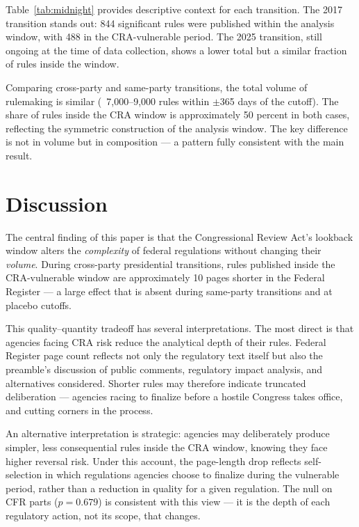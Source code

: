 \documentclass[12pt]{article}
\begin{document}


Table~\ref{tab:midnight} provides descriptive context for each transition. The 2017 transition stands out: 844 significant rules were published within the analysis window, with 488 in the CRA-vulnerable period. The 2025 transition, still ongoing at the time of data collection, shows a lower total but a similar fraction of rules inside the window.

Comparing cross-party and same-party transitions, the total volume of rulemaking is similar (~7,000--9,000 rules within $\pm$365 days of the cutoff). The share of rules inside the CRA window is approximately 50 percent in both cases, reflecting the symmetric construction of the analysis window. The key difference is not in volume but in composition --- a pattern fully consistent with the main result.


\section{Discussion}

The central finding of this paper is that the Congressional Review Act's lookback window alters the \textit{complexity} of federal regulations without changing their \textit{volume}. During cross-party presidential transitions, rules published inside the CRA-vulnerable window are approximately 10 pages shorter in the Federal Register --- a large effect that is absent during same-party transitions and at placebo cutoffs.

This quality--quantity tradeoff has several interpretations. The most direct is that agencies facing CRA risk reduce the analytical depth of their rules. Federal Register page count reflects not only the regulatory text itself but also the preamble's discussion of public comments, regulatory impact analysis, and alternatives considered. Shorter rules may therefore indicate truncated deliberation --- agencies racing to finalize before a hostile Congress takes office, and cutting corners in the process.

An alternative interpretation is strategic: agencies may deliberately produce simpler, less consequential rules inside the CRA window, knowing they face higher reversal risk. Under this account, the page-length drop reflects self-selection in which regulations agencies choose to finalize during the vulnerable period, rather than a reduction in quality for a given regulation. The null on CFR parts ($p = 0.679$) is consistent with this view --- it is the depth of each regulatory action, not its scope, that changes.
\end{document}
